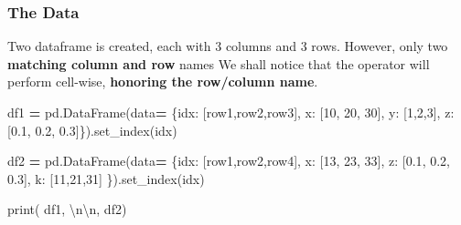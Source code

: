 \documentclass[
]{book}
\newenvironment{Shaded}{\begin{snugshade}}{\end{snugshade}}
\newcommand{\BuiltInTok}[1]{#1}
\newcommand{\CharTok}[1]{\textcolor[rgb]{0.5,0.5,0.5}{#1}}
\newcommand{\DecValTok}[1]{\textcolor[rgb]{0.06,0.06,0.06}{#1}}
\newcommand{\FloatTok}[1]{\textcolor[rgb]{0.06,0.06,0.06}{#1}}
\newcommand{\NormalTok}[1]{#1}
\newcommand{\OperatorTok}[1]{\textcolor[rgb]{0.43,0.43,0.43}{\textbf{#1}}}
\newcommand{\StringTok}[1]{\textcolor[rgb]{0.5,0.5,0.5}{#1}}
\begin{document}
\hypertarget{the-data-1}{%
\subsubsection{The Data}\label{the-data-1}}

Two dataframe is created, each with 3 columns and 3 rows. However, only two \textbf{matching column and row} names We shall notice that the operator will perform cell-wise, \textbf{honoring the row/column name}.

\begin{Shaded}
\begin{Highlighting}[]
\NormalTok{df1 }\OperatorTok{=}\NormalTok{ pd.DataFrame(data}\OperatorTok{=}
\NormalTok{  \{}\StringTok{\textquotesingle{}idx\textquotesingle{}}\NormalTok{: [}\StringTok{\textquotesingle{}row1\textquotesingle{}}\NormalTok{,}\StringTok{\textquotesingle{}row2\textquotesingle{}}\NormalTok{,}\StringTok{\textquotesingle{}row3\textquotesingle{}}\NormalTok{],}
   \StringTok{\textquotesingle{}x\textquotesingle{}}\NormalTok{: [}\DecValTok{10}\NormalTok{, }\DecValTok{20}\NormalTok{, }\DecValTok{30}\NormalTok{],}
   \StringTok{\textquotesingle{}y\textquotesingle{}}\NormalTok{: [}\DecValTok{1}\NormalTok{,}\DecValTok{2}\NormalTok{,}\DecValTok{3}\NormalTok{],}
   \StringTok{\textquotesingle{}z\textquotesingle{}}\NormalTok{: [}\FloatTok{0.1}\NormalTok{, }\FloatTok{0.2}\NormalTok{, }\FloatTok{0.3}\NormalTok{]\}).set\_index(}\StringTok{\textquotesingle{}idx\textquotesingle{}}\NormalTok{)}
   
\NormalTok{df2 }\OperatorTok{=}\NormalTok{ pd.DataFrame(data}\OperatorTok{=}
\NormalTok{  \{}\StringTok{\textquotesingle{}idx\textquotesingle{}}\NormalTok{: [}\StringTok{\textquotesingle{}row1\textquotesingle{}}\NormalTok{,}\StringTok{\textquotesingle{}row2\textquotesingle{}}\NormalTok{,}\StringTok{\textquotesingle{}row4\textquotesingle{}}\NormalTok{],}
   \StringTok{\textquotesingle{}x\textquotesingle{}}\NormalTok{: [}\DecValTok{13}\NormalTok{, }\DecValTok{23}\NormalTok{, }\DecValTok{33}\NormalTok{],}
   \StringTok{\textquotesingle{}z\textquotesingle{}}\NormalTok{: [}\FloatTok{0.1}\NormalTok{, }\FloatTok{0.2}\NormalTok{, }\FloatTok{0.3}\NormalTok{],}
   \StringTok{\textquotesingle{}k\textquotesingle{}}\NormalTok{: [}\DecValTok{11}\NormalTok{,}\DecValTok{21}\NormalTok{,}\DecValTok{31}\NormalTok{]}
\NormalTok{   \}).set\_index(}\StringTok{\textquotesingle{}idx\textquotesingle{}}\NormalTok{)}
   
\BuiltInTok{print}\NormalTok{( df1, }\StringTok{\textquotesingle{}}\CharTok{\textbackslash{}n\textbackslash{}n}\StringTok{\textquotesingle{}}\NormalTok{, df2)}
\end{Highlighting}
\end{Shaded}
\end{document}
